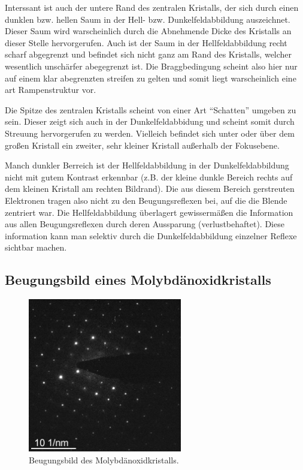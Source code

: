 \documentclass[slug=TEM, room=IFW, supervisor=?, coursedate=23.\ 01.\ 2020]{../../Lab_Report_LaTeX/lab_report}
\begin{document}
Interssant ist auch der untere Rand des zentralen Kristalls, der sich
durch einen dunklen bzw. hellen Saum in der Hell-
bzw. Dunkelfeldabbildung auszeichnet. Dieser Saum wird warscheinlich
durch die Abnehmende Dicke des Kristalls an dieser Stelle
hervorgerufen. Auch ist der Saum in der Hellfeldabbildung recht scharf
abgegrenzt und befindet sich nicht ganz am Rand des Kristalls, welcher
wesentlich unsch\"arfer abegegrenzt ist. Die Braggbedingung scheint
also hier nur auf einem klar abegrenzten streifen zu gelten und somit
liegt warscheinlich eine art Rampenstruktur vor.

Die Spitze des zentralen Kristalls scheint von einer Art ``Schatten''
umgeben zu sein. Dieser zeigt sich auch in der Dunkelfeldabbidung und
scheint somit durch Streuung hervorgerufen zu werden. Vielleich
befindet sich unter oder \"uber dem gro\ss{}en Kristall ein zweiter,
sehr kleiner Kristall au\ss{}erhalb der Fokusebene.

Manch dunkler Berreich ist der Hellfeldabbildung in der
Dunkelfeldabbildung nicht mit gutem Kontrast erkennbar (z.B. der
kleine dunkle Bereich rechts auf dem kleinen Kristall am rechten
Bildrand). Die aus diesem Bereich gerstreuten Elektronen tragen also
nicht zu den Beugungsreflexen bei, auf die die Blende zentriert war.
Die Hellfeldabbildung \"uberlagert gewisserm\"a\ss{}en die Information
aus allen Beugungsreflexen durch deren Aussparung
(verlustbehaftet). Diese information kann man selektiv durch die
Dunkelfeldabbildung einzelner Reflexe sichtbar machen.

\subsection{Beugungsbild eines Molybdänoxidkristalls}
\label{sec:beugungmolyb}

\begin{figure}[h]
	\centering
	\includegraphics[width=0.6\textwidth]{../messungen/molybdaen/auswertung/MoO_diffr_5_m.jpg}%
	\caption{Beugungsbild des Molybdänoxidkristalls.}
	\label{fig:molbeug}
\end{figure}
\end{document}
